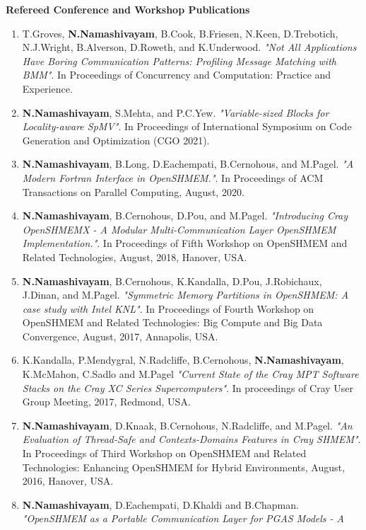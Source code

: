 \textbf{Refereed Conference and Workshop Publications}
\begin{enumerate}
\setcounter{enumi}{0}
\item T.Groves, \textbf{N.Namashivayam}, B.Cook, B.Friesen, N.Keen, D.Trebotich,
      N.J.Wright, B.Alverson, D.Roweth, and K.Underwood. \textit{"Not All
      Applications Have Boring Communication Patterns: Profiling Message Matching
      with BMM"}. In Proceedings of Concurrency and Computation: Practice and Experience.
\item \textbf{N.Namashivayam}, S.Mehta, and P.C.Yew. \textit{"Variable-sized 
      Blocks for Locality-aware SpMV"}. In Proceedings of International
        Symposium on Code Generation and Optimization (CGO 2021).
\item \textbf{N.Namashivayam}, B.Long, D.Eachempati, B.Cernohous, and M.Pagel.
      \textit{"A Modern Fortran Interface in OpenSHMEM."}. In Proceedings of
      ACM Transactions on Parallel Computing, August, 2020.
\item \textbf{N.Namashivayam}, B.Cernohous, D.Pou, and M.Pagel.
      \textit{"Introducing Cray OpenSHMEMX - A Modular Multi-Communication Layer
      OpenSHMEM Implementation."}. In Proceedings of Fifth Workshop on OpenSHMEM
      and Related Technologies, August, 2018, Hanover, USA.
\item \textbf{N.Namashivayam}, B.Cernohous, K.Kandalla, D.Pou, J.Robichaux,
      J.Dinan, and M.Pagel.
      \textit{"Symmetric Memory Partitions in OpenSHMEM: A case study with
      Intel KNL"}. In Proceedings of Fourth Workshop on OpenSHMEM and
      Related Technologies: Big Compute and Big Data Convergence, August,
      2017, Annapolis, USA.
\item K.Kandalla, P.Mendygral, N.Radcliffe, B.Cernohous,
      \textbf{N.Namashivayam}, K.McMahon, C.Sadlo and M.Pagel
      \textit{"Current State of the Cray MPT Software Stacks on the Cray XC
      Series Supercomputers"}. In proceedings of Cray User Group Meeting,
      2017, Redmond, USA.
\item \textbf{N.Namashivayam}, D.Knaak, B.Cernohous, N.Radcliffe, and
      M.Pagel.
      \textit{"An Evaluation of Thread-Safe and Contexts-Domains Features in
      Cray SHMEM"}. In Proceedings of Third Workshop on OpenSHMEM and Related
      Technologies: Enhancing OpenSHMEM for Hybrid Environments, August, 2016,
      Hanover, USA.
\item \textbf{N.Namashivayam}, D.Eachempati, D.Khaldi and B.Chapman.
      \textit{"OpenSHMEM as a Portable Communication Layer for PGAS Models - A
}
\end{enumerate}
